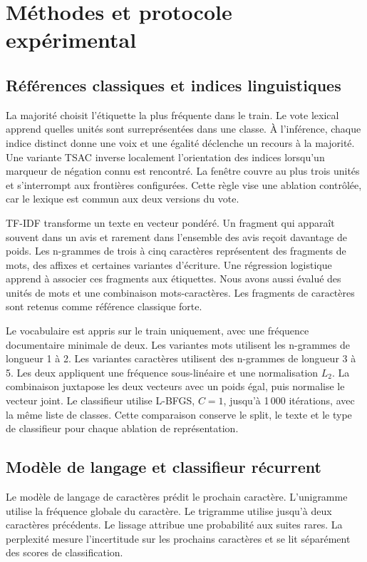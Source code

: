 \section{Méthodes et protocole expérimental}\label{sec:methodes}

\subsection{Références classiques et indices linguistiques}
La majorité choisit l’étiquette la plus fréquente dans le train. Le vote lexical apprend quelles unités sont surreprésentées dans une classe. À l’inférence, chaque indice distinct donne une voix et une égalité déclenche un recours à la majorité. Une variante TSAC inverse localement l’orientation des indices lorsqu’un marqueur de négation connu est rencontré. La fenêtre couvre au plus trois unités et s’interrompt aux frontières configurées. Cette règle vise une ablation contrôlée, car le lexique est commun aux deux versions du vote.

TF-IDF transforme un texte en vecteur pondéré. Un fragment qui apparaît souvent dans un avis et rarement dans l’ensemble des avis reçoit davantage de poids. Les n-grammes de trois à cinq caractères représentent des fragments de mots, des affixes et certaines variantes d’écriture. Une régression logistique apprend à associer ces fragments aux étiquettes. Nous avons aussi évalué des unités de mots et une combinaison mots-caractères. Les fragments de caractères sont retenus comme référence classique forte.

Le vocabulaire est appris sur le train uniquement, avec une fréquence documentaire minimale de deux. Les variantes mots utilisent les n-grammes de longueur 1 à 2. Les variantes caractères utilisent des n-grammes de longueur 3 à 5. Les deux appliquent une fréquence sous-linéaire et une normalisation $L_2$. La combinaison juxtapose les deux vecteurs avec un poids égal, puis normalise le vecteur joint. Le classifieur utilise L-BFGS, $C=1$, jusqu’à 1\,000 itérations, avec la même liste de classes. Cette comparaison conserve le split, le texte et le type de classifieur pour chaque ablation de représentation.

\subsection{Modèle de langage et classifieur récurrent}
Le modèle de langage de caractères prédit le prochain caractère. L’unigramme utilise la fréquence globale du caractère. Le trigramme utilise jusqu’à deux caractères précédents. Le lissage attribue une probabilité aux suites rares. La perplexité mesure l’incertitude sur les prochains caractères et se lit séparément des scores de classification.

